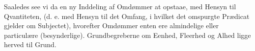\documentclass[12pt]{book}
\def\emph#1{#1}%
\begin{document}
Saaledes see vi da en ny Inddeling af Omdømmer at opstaae, med Hensyn til
\emph{Qvantiteten}, (d. e. med Hensyn til det \emph{Omfang}, i hvilket det omspurgte
\emph{Prædicat} gjelder om \emph{Subjectet}), hvorefter Omdømmer enten ere
\emph{almindelige} eller \emph{particulære} (besynderlige). Grundbegreberne om
\emph{Eenhed}, \emph{Fleerhed} og \emph{Alhed} ligge herved til Grund.
\end{document}
